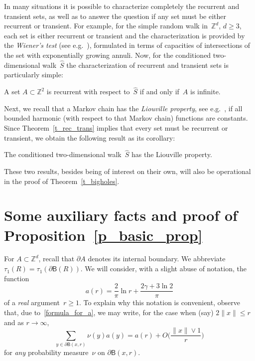 \documentclass[AHL,Unicode,longabstracts]{cedram}
\newcommand{\1}[1]{{\mathbf 1}{\{#1\}}}
\newcommand{\Z}{\mathbb{Z}}
\newcommand{\s}{{\widehat S}}
\newcommand{\8}{{\infty}}
\newcommand{\B}{{\mathsf B}}
\begin{document}
In many situations it is possible to characterize completely the recurrent and transient sets, as well as to answer the question if any set must be either recurrent or transient. For example, for the simple random walk in~$\Z^d$, $d\geq 3$, each set is either recurrent or transient and the characterization is provided by the \emph{Wiener's test} (see e.g.~\cite[Corollary~6.5.9]{LL10}), formulated in terms of capacities of intersections of the set with exponentially growing annuli. Now, for the conditioned two-dimensional walk~$\s$ the characterization of recurrent and transient sets is particularly simple:

\begin{theo}\label{t_rec_trans}
A set $A\subset\Z^2$ is recurrent with respect to~$\s$ if and only if~$A$ is infinite.
\end{theo}

Next, we recall that a Markov chain has the \emph{Liouville property}, see e.g.~\cite[Chapter~IV]{Woess09}, if all bounded harmonic (with respect to that Markov chain) functions are constants. Since Theorem~\ref{t_rec_trans} implies that every set must be recurrent or transient, we obtain the following result as its corollary:

\begin{theo}\label{t_Liouville}
The conditioned two-dimensional walk~$\s$ has the Liouville property.
\end{theo}

These two results, besides being of interest on their own, will also be operational in the proof of Theorem~\ref{t_bigholes}.



\section{Some auxiliary facts and proof of Proposition~\ref{p_basic_prop}}\label{s_aux}

For $A\subset \Z^d$, recall that $\partial A$ denotes its internal boundary. We abbreviate $\tau_1(R) = \tau_1(\partial \B(R)).$ We will consider, with a slight abuse of notation, the function
\[
a(r)=\frac{2}{\pi}\ln r + \frac{2\gamma+ 3\ln 2}{\pi}
\]
of a \emph{real} argument~$r\geq 1$. To explain why this notation is convenient, observe that, due to~\eqref{formula_for_a}, we may write, for the case when (say) $2\|x\|\leq r$ and as $r\to\infty$,
\begin{equation}\label{real_a}
\sum_{y\in\partial \B(x,r)} \nu(y)a(y) = a(r) + O\Big(\frac{\|x\|\vee 1}{r}\Big)
\end{equation}
for \emph{any} probability measure~$\nu$ on $\partial \B(x,r)$.
\end{document}
